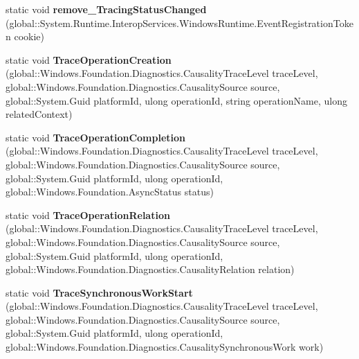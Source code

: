 \begin{DoxyCompactItemize}
static void {\bfseries remove\+\_\+\+Tracing\+Status\+Changed} (global\+::\+System.\+Runtime.\+Interop\+Services.\+Windows\+Runtime.\+Event\+Registration\+Token cookie)
\item 
\mbox{\label{class_windows_1_1_foundation_1_1_diagnostics_1_1_async_causality_tracer_a7e21db63d48eac51522b889a4eaab22d}} 
static void {\bfseries Trace\+Operation\+Creation} (global\+::\+Windows.\+Foundation.\+Diagnostics.\+Causality\+Trace\+Level trace\+Level, global\+::\+Windows.\+Foundation.\+Diagnostics.\+Causality\+Source source, global\+::\+System.\+Guid platform\+Id, ulong operation\+Id, string operation\+Name, ulong related\+Context)
\item 
\mbox{\label{class_windows_1_1_foundation_1_1_diagnostics_1_1_async_causality_tracer_a6f0f3e531cde0820e070eaa0a2cb959a}} 
static void {\bfseries Trace\+Operation\+Completion} (global\+::\+Windows.\+Foundation.\+Diagnostics.\+Causality\+Trace\+Level trace\+Level, global\+::\+Windows.\+Foundation.\+Diagnostics.\+Causality\+Source source, global\+::\+System.\+Guid platform\+Id, ulong operation\+Id, global\+::\+Windows.\+Foundation.\+Async\+Status status)
\item 
\mbox{\label{class_windows_1_1_foundation_1_1_diagnostics_1_1_async_causality_tracer_aeac1886be232699acc5bbcfe37ed2ab2}} 
static void {\bfseries Trace\+Operation\+Relation} (global\+::\+Windows.\+Foundation.\+Diagnostics.\+Causality\+Trace\+Level trace\+Level, global\+::\+Windows.\+Foundation.\+Diagnostics.\+Causality\+Source source, global\+::\+System.\+Guid platform\+Id, ulong operation\+Id, global\+::\+Windows.\+Foundation.\+Diagnostics.\+Causality\+Relation relation)
\item 
\mbox{\label{class_windows_1_1_foundation_1_1_diagnostics_1_1_async_causality_tracer_a335d95a15aa1675ebbb7a8451d669e80}} 
static void {\bfseries Trace\+Synchronous\+Work\+Start} (global\+::\+Windows.\+Foundation.\+Diagnostics.\+Causality\+Trace\+Level trace\+Level, global\+::\+Windows.\+Foundation.\+Diagnostics.\+Causality\+Source source, global\+::\+System.\+Guid platform\+Id, ulong operation\+Id, global\+::\+Windows.\+Foundation.\+Diagnostics.\+Causality\+Synchronous\+Work work)

\end{DoxyCompactItemize}
